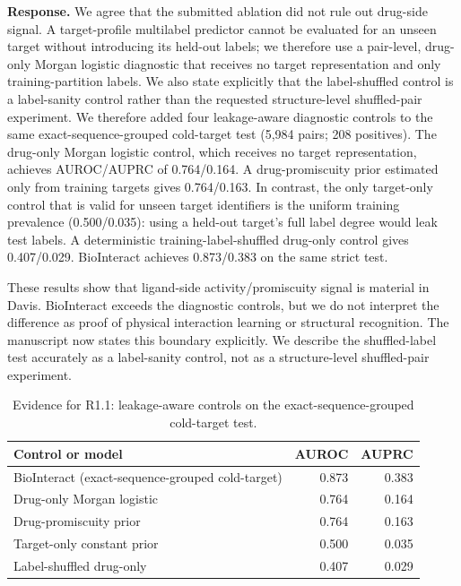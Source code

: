 \documentclass[11pt,a4paper]{article}
\newcommand{\response}{\noindent\textbf{Response.} }
\begin{document}
\response We agree that the submitted ablation did not rule out drug-side
signal. A target-profile multilabel predictor cannot be evaluated for an unseen
target without introducing its held-out labels; we therefore use a pair-level,
drug-only Morgan logistic diagnostic that receives no target representation and
only training-partition labels. We also state explicitly that the label-shuffled
control is a label-sanity control rather than the requested structure-level
shuffled-pair experiment. We therefore added four leakage-aware diagnostic
controls to the same exact-sequence-grouped cold-target test (5,984 pairs; 208
positives). The
drug-only Morgan logistic control, which receives no target representation,
achieves AUROC/AUPRC of 0.764/0.164.  A drug-promiscuity prior estimated only
from training targets gives 0.764/0.163.  In contrast, the only target-only
control that is valid for unseen target identifiers is the uniform training
prevalence (0.500/0.035): using a held-out target's full label degree would
leak test labels.  A deterministic training-label-shuffled drug-only control
gives 0.407/0.029.  BioInteract achieves 0.873/0.383 on the same strict test.

These results show that ligand-side activity/promiscuity signal is material in
Davis.  BioInteract exceeds the diagnostic controls, but we do not interpret
the difference as proof of physical interaction learning or structural
recognition.  The manuscript now states this boundary explicitly.  We describe
the shuffled-label test accurately as a label-sanity control, not as a
structure-level shuffled-pair experiment.

\begin{table}[H]
\centering
\small
\caption{Evidence for R1.1: leakage-aware controls on the exact-sequence-grouped cold-target test.}
\begin{tabular}{lrr}
\toprule
Control or model & AUROC & AUPRC \\
\midrule
BioInteract (exact-sequence-grouped cold-target) & 0.873 & 0.383 \\
Drug-only Morgan logistic & 0.764 & 0.164 \\
Drug-promiscuity prior & 0.764 & 0.163 \\
Target-only constant prior & 0.500 & 0.035 \\
Label-shuffled drug-only & 0.407 & 0.029 \\
\bottomrule
\end{tabular}
\end{table}
\end{document}

